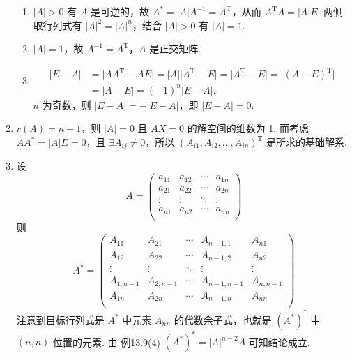 \begin{enumerate}
\begin{enumerate}
              \item $\lvert A \rvert > 0$ 有 $A$ 是可逆的，故 $A^* = \lvert A \rvert A^{-1} = A^{\mathrm{T}}$，从而 $A^{\mathrm{T}}A = \lvert A \rvert E$. 两侧取行列式有 $\lvert A \rvert^2 = \lvert A \rvert^n $，结合 $\lvert A \rvert > 0$ 有 $\lvert A \rvert = 1$.

              \item $\lvert A \rvert = 1$，故 $A^{-1} = A^{\mathrm{T}}$，$A$ 是正交矩阵.

              \item \begin{align*}
                        \lvert E-A \rvert & = \lvert AA^{\mathrm{T}}-AE \rvert = \lvert A \rvert \lvert A^{\mathrm{T}}-E\rvert = \lvert A^{\mathrm{T}}-E\rvert = \lvert (A-E)^{\mathrm{T}} \rvert \\
                                          & = \lvert A-E \rvert = (-1)^n\lvert E-A \rvert.
                    \end{align*}
                    $n$ 为奇数，则 $\lvert E-A \rvert = -\lvert E-A \rvert$，即 $\lvert E-A \rvert = 0$.
          \end{enumerate}

    \item $r(A) = n-1$，则 $\lvert A \rvert = 0$ 且 $AX = 0$ 的解空间的维数为 1. 而考虑 $AA^* = \lvert A \rvert E = 0$，且 $\exists A_{ij} \neq 0$，所以 $(A_{i1}, A_{i2}, \ldots , A_{in})^{\mathrm{T}}$ 是所求的基础解系.

    \item 设 \[A = \begin{pmatrix}
                  a_{11} & a_{12} & \cdots & a_{1n} \\
                  a_{21} & a_{22} & \cdots & a_{2n} \\
                  \vdots & \vdots & \ddots & \vdots \\
                  a_{n1} & a_{n2} & \cdots & a_{nn} \\
              \end{pmatrix}\]
          则 \[A^* = \begin{pmatrix}
                  A_{11}     & A_{21}     & \cdots & A_{n-1, 1}   & A_{n1}     \\
                  A_{12}     & A_{22}     & \cdots & A_{n-1, 2}   & A_{n2}     \\
                  \vdots     & \vdots     & \ddots & \vdots       & \vdots     \\
                  A_{1, n-1} & A_{2, n-1} & \cdots & A_{n-1, n-1} & A_{n, n-1} \\
                  A_{1n}     & A_{2n}     & \cdots & A_{n-1, n}   & A_{nn}     \\
              \end{pmatrix}\]
          注意到目标行列式是 $A^*$ 中元素 $A_{nn}$ 的代数余子式，也就是 $(A^*)^*$ 中 $(n, n)$ 位置的元素. 由 {例13.9(4)} $(A^*)^* = \lvert A \rvert^{n-2}A$ 可知结论成立. %


\end{enumerate}
